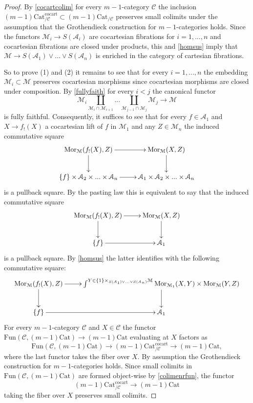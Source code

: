 \documentclass[10pt,oneside]{article}
\numberwithin{equation}{section} %
\numberwithin{figure}{section} %
\theoremstyle{plain}
\theoremstyle{definition}
\newcommand{\mA}{{\mathcal A}}
\newcommand{\mC}{{\mathcal C}}
\newcommand{\mM}{{\mathcal M}}
\newcommand{\bj}{{j}}
\newcommand{\bi}{{i}}
\newcommand{\Cat}{\mathrm{Cat}}
\newcommand{\Fun}{\mathrm{Fun}}
\newcommand{\cocart}{{\mathrm{cocart}}}
\newcommand{\Mor}{{\mathrm{Mor}}}
\begin{document}
\begin{proof}
By \cref{cocartcolim} for every $m-1$-category $\mC$ the inclusion
$(m-1) \Cat^\cocart_{/\mC}\subset (m-1) \Cat_{/\mC}$
preserves small colimits under the assumption that the Grothendieck construction for $m-1$-categories holds.
Since the functors $\mM_i \to S(\mA_i)$ are cocartesian fibrations
for $i=1,...,n$ and cocartesian fibrations are closed under products,
this and \cref{homsus} imply that $\mM \to S(\mA_1) \vee \ldots \vee S(\mA_n)$ is enriched in the category of cartesian fibrations.

So to prove (1) and (2) it remains to see that for every $\bi=1,...,n$
the embedding $ \mM_i \subset \mM$ preserves cocartesian morphisms
since cocartesian morphisms are closed under composition.
By \cref{fullyfaith} for every $ \bi < \bj$ the canonical functor
$$\mM_\bi \coprod_{\mM_\bi \cap \mM_{\bi+1}} ... \coprod_{\mM_{\bj-1} \cap \mM_{\bj}} \mM_\bj \to \mM$$ is fully faithful.
Consequently, it suffices to see that 
for every $f \in \mA_{1}$ and $X \to f_!(X) $ a cocartesian lift of $f$ in $\mM_1$ and any $Z \in \mM_n$ the induced commutative square
$$\begin{xy}
\xymatrix{
\Mor_{\mM}(f_!(X),Z) \ar[d]^{} \ar[r]
& \Mor_{\mM}(X,Z) \ar[d] 
\\ 
\{f\} \times \mA_{2} \times ... \times \mA_n \ar[r] & \mA_{1} \times \mA_{2} \times ... \times \mA_n}
\end{xy}$$	
is a pullback square.
By the pasting law this is equivalent to say that the 
induced commutative square
$$\begin{xy}
\xymatrix{
\Mor_{\mM}(f_!(X),Z) \ar[d]^{} \ar[r]
& \Mor_{\mM}(X,Z) \ar[d] 
\\ 
\{f\} \ar[r] & \mA_{1}}
\end{xy}$$	
is a pullback square.
By \cref{homsus} the latter identifies with the following commutative square:
\begin{equation}\label{sqqo}
\begin{xy}
\xymatrix{
\Mor_{\mM}(f_!(X),Z) \ar[d]^{} \ar[r]
& \int^{Y \in \{1\}\times_{S(\mA_1) \vee \ldots \vee S(\mA_n)} \mM} \Mor_{\mM_1}(X,Y) \times \Mor_{\mM}(Y,Z) \ar[d] 
\\ 
\{f\} \ar[r] & \mA_{1}}
\end{xy}\end{equation}	
For every $m-1$-category $\mC$ and $X \in \mC$ the functor
$\Fun(\mC,(m-1)\Cat) \to (m-1)\Cat $
evaluating at $X$ factors as $$\Fun(\mC,(m-1)\Cat) \to (m-1)\Cat^\cocart_{/\mC} \to (m-1)\Cat,$$
where the last functor takes the fiber over $X$.
By assumption the Grothendieck construction for $m-1$-categories holds.
Since small colimits in $\Fun(\mC,(m-1)\Cat)$ are formed object-wise by \cref{colimenrfun}, the functor
$$(m-1)\Cat^\cocart_{/\mC} \to (m-1)\Cat$$ taking the fiber over $X$
preserves small colimits.


\end{proof}
\end{document}
